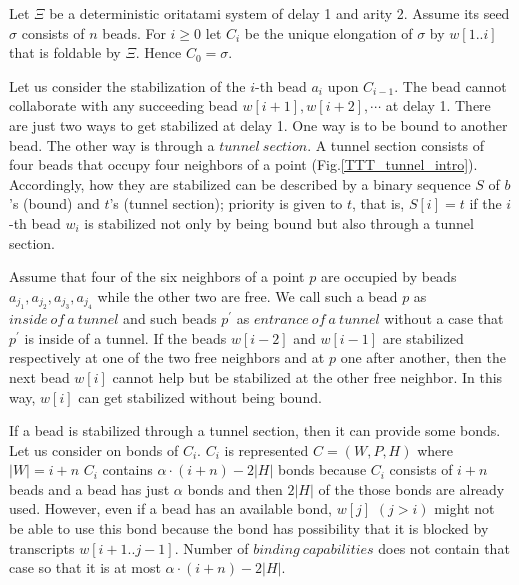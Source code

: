 \documentclass[runningheads]{llncs}
\begin{document}


Let $\Xi$ be a deterministic oritatami system of delay 1 and arity 2. Assume its seed $\sigma$ consists of $n$ beads.
For $i \geq 0$ let $C_i$ be the unique elongation of $\sigma$ by $w[1..i]$ that is foldable by $\Xi$. Hence $C_0 = \sigma$.


Let us consider the stabilization of the $i$-th bead $a_i$ upon $C_{i-1}$. The bead cannot collaborate with any succeeding bead $w[i+1],w[i+2],\cdots$ at delay 1. There are just two ways to get stabilized at delay 1. One way is to be bound to another bead. The other way is through a $tunnel\ section$. A tunnel section consists of four beads that occupy four neighbors of a point (Fig.\ref{TTT_tunnel_intro}). 
Accordingly, how they are stabilized can be described by a binary sequence $S$ of $b$'s (bound) and $t$'s (tunnel section); priority is given to $t$, that is, $S[i] = t$ if the $i$-th bead $w_i$ is stabilized not only by being bound but also through a tunnel section. 

Assume that four of the six neighbors of a point $p$ are occupied by beads $a_{j_1},a_{j_2},a_{j_3},a_{j_4}$ while the other two are free. We call such a bead $p$ as $inside\ of\ a\ tunnel$ and such beads $p^\prime$ as $entrance\ of\ a\ tunnel$ without a case that $p^\prime$ is inside of a tunnel. If the beads $w[i-2]$ and $w[i-1]$ are stabilized respectively at one of the two free neighbors and at $p$ one after another, then the next bead $w[i]$ cannot help but be stabilized at the other free neighbor. In this way, $w[i]$ can get stabilized without being bound.



If a bead is stabilized through a tunnel section, then it can provide some bonds. Let us consider on bonds of $C_i$. $C_i$ is represented $C = (W,P,H)$ where $|W| = i + n$ $C_i$ contains $\alpha \cdot (i + n) - 2|H|$ bonds because $C_i$ consists of $i + n$ beads and a bead has just $\alpha$ bonds and then $2 |H|$ of the those bonds are already used. However, even if a bead has an available bond, $w[j]$ $(j > i)$ might not be able to use this bond because the bond has possibility that it is blocked by transcripts $w[i+1..j-1]$. Number of $binding\ capabilities$ does not contain that case so that it is at most $\alpha \cdot (i + n) - 2|H|$.
\end{document}
